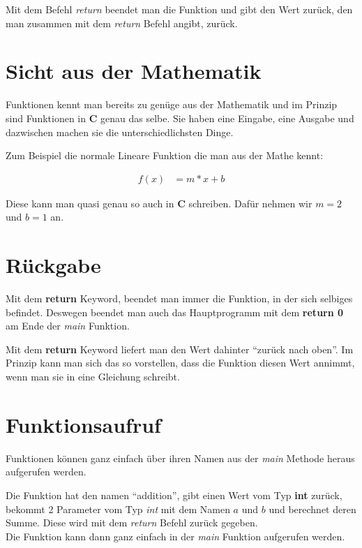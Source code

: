 \documentclass[c_worksheet.tex]{subfiles}
\begin{document}
Mit dem Befehl \emph{return} beendet man die Funktion und gibt den Wert zurück, den man zusammen mit dem \emph{return} Befehl angibt, zurück.

\section{Sicht aus der Mathematik}

Funktionen kennt man bereits zu genüge aus der Mathematik und im Prinzip sind Funktionen in \textbf{C} genau das selbe. Sie haben eine Eingabe, eine Ausgabe und dazwischen machen sie die unterschiedlichsten Dinge.

Zum Beispiel die normale Lineare Funktion die man aus der Mathe kennt:

\begin{align*}
 f(x) &= m*x + b
 \end{align*} 

 Diese kann man quasi genau so auch in \textbf{C} schreiben. Dafür nehmen wir \(m=2\) und \(b=1\) an.

 


\section{Rückgabe} 

Mit dem \textbf{return} Keyword, beendet man immer die Funktion, in der sich selbiges befindet. Deswegen beendet man auch das Hauptprogramm mit dem \textbf{return 0} am Ende der \emph{main} Funktion.



Mit dem \textbf{return}	Keyword liefert man den Wert dahinter ``zurück nach oben''. Im Prinzip kann man sich das so vorstellen, dass die Funktion diesen Wert annimmt, wenn man sie in eine Gleichung schreibt.

  


\section{Funktionsaufruf} 

Funktionen können ganz einfach über ihren Namen aus der \emph{main} Methode heraus aufgerufen werden.

 

Die Funktion hat den namen ``addition'', gibt einen Wert vom Typ \textbf{int} zurück, bekommt 2 Parameter vom Typ \emph{int} mit dem Namen \(a\) und \(b\) und berechnet deren Summe. Diese wird mit dem \emph{return} Befehl zurück gegeben.\\
Die Funktion kann dann ganz einfach in der \emph{main} Funktion aufgerufen werden.
\end{document}

